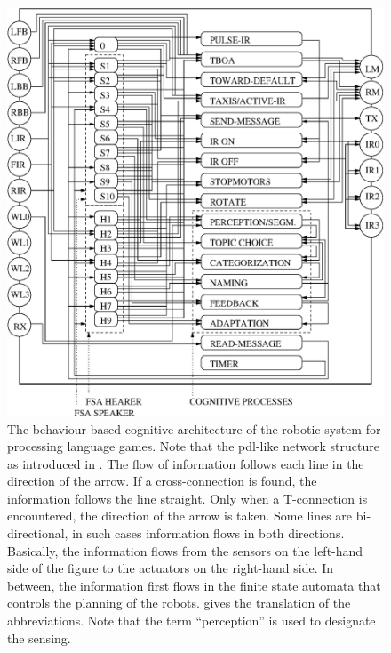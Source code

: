 \begin{figure}
\centerline{\includegraphics[width=12cm]{lang_games/architecture.eps}}
\caption{The behaviour-based cognitive architecture of the robotic system for processing language games. Note that the {\sc pdl}-like network structure as introduced in . The flow of information follows each line in the direction of the arrow. If a cross-connection is found, the information follows the line straight. Only when a T-connection is encountered, the direction of the arrow is taken. Some lines are bi-directional, in such cases information flows in both directions. Basically, the information flows from the sensors on the left-hand side of the figure to the actuators on the right-hand side. In between, the information first flows in the finite state automata that controls the planning of the robots.  gives the translation of the abbreviations. Note that the term ``perception'' is used to designate the sensing.}
\label{f:architecture}
\end{figure}

